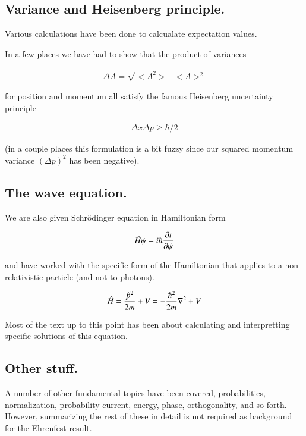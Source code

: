 \documentclass{article}
\begin{document}
\subsection{ Variance and Heisenberg principle. }

Various calculations have been done to calcualate expectation values.

In a few places we have had to show that the product of variances

\begin{align*}
\Delta A = \sqrt{<A^2> - <A>^2}
\end{align*}

for position and momentum all satisfy the famous Heisenberg uncertainty
principle

\begin{align*}
\Delta x \Delta p \ge \hbar/2
\end{align*}

(in a couple places this formulation is a bit fuzzy since our squared
momentum variance $(\Delta p)^2$ has been negative).

\subsection{ The wave equation. }

We are also given Schr\"{o}dinger equation in Hamiltonian form

\begin{align*}
\hat{H} \psi = i \hbar \frac{\partial{t}}{\partial {\psi}}
\end{align*}

and have worked with the specific form of the Hamiltonian that applies to
a non-relativistic particle (and not to photons).

\begin{align*}
\hat{H} = \frac{\hat{p}^2}{2m} + V = -\frac{\hbar^2}{2m} \nabla^2 + V
\end{align*}

Most of the text up to this point has been about calculating and interpretting
specific solutions of this equation.

\subsection{ Other stuff. }

A number of other fundamental topics have been covered, probabilities, normalization, probability current, energy, phase, orthogonality, and so forth.  However, summarizing the rest of these in detail is not required as 
background for the Ehrenfest result.
\end{document}

